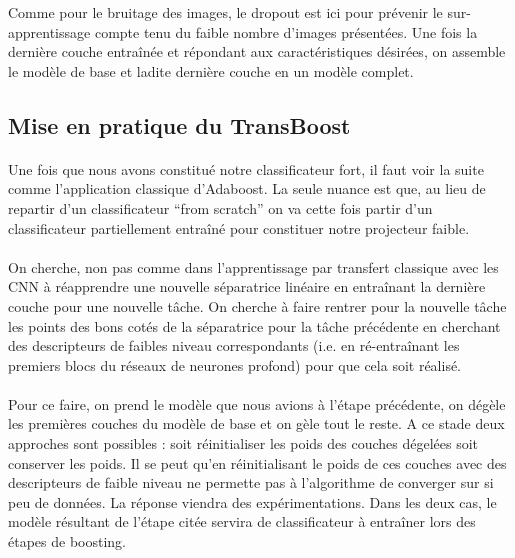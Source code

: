 \documentclass[11 pt]{article}
\begin{document}
Comme pour le bruitage des images, le dropout est ici pour prévenir le sur-apprentissage compte tenu du faible nombre d’images présentées.
Une fois la dernière couche entraînée et répondant aux caractéristiques désirées, on assemble le modèle de base et ladite dernière couche en un modèle complet.


\subsection{Mise en pratique du TransBoost}
\paragraph{}Une fois que nous avons constitué notre classificateur fort, il faut voir la suite comme l’application classique d’Adaboost. La seule nuance est que, au lieu de repartir d’un classificateur “from scratch” on va cette fois partir d’un classificateur partiellement entraîné pour constituer notre projecteur faible.

\paragraph{}On cherche, non pas comme dans l'apprentissage par transfert classique avec les CNN à réapprendre une nouvelle séparatrice linéaire en entraînant la dernière couche pour une nouvelle tâche. On cherche à faire rentrer pour la nouvelle tâche les points des bons cotés de la séparatrice pour la tâche précédente en cherchant des descripteurs de faibles niveau correspondants (i.e. en ré-entraînant les premiers blocs du réseaux de neurones profond) pour que cela soit réalisé.

\paragraph{}Pour ce faire,  on prend le modèle que nous avions à l’étape précédente, on dégèle les premières couches du modèle de base et on gèle tout le reste. A ce stade deux approches sont possibles : soit réinitialiser les poids des couches dégelées soit conserver les poids. Il se peut qu’en réinitialisant le poids de ces couches avec des descripteurs de faible niveau ne permette pas à l’algorithme de converger sur si peu de données. La réponse viendra des expérimentations. Dans les deux cas, le modèle résultant de l’étape citée servira de classificateur à entraîner lors des étapes de boosting.\\
\end{document}
